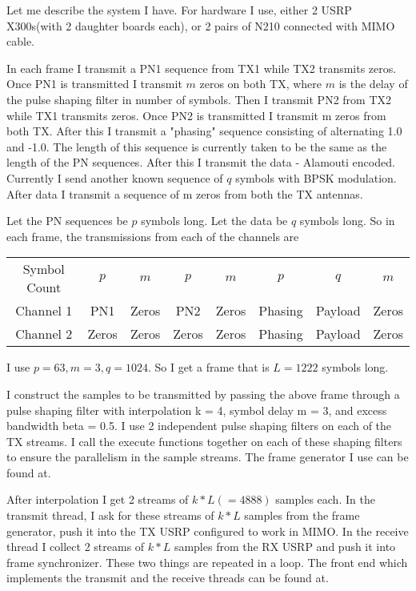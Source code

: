 \documentclass{article}
\begin{document}
Let me describe the system I have. For hardware I use, either 2 USRP
X300s(with 2 daughter boards each), or 2 pairs of N210 connected with
MIMO cable.

In each frame I transmit a PN1 sequence from TX1 while TX2 transmits
zeros. Once PN1 is transmitted I transmit $m$ zeros on both TX, where $m$ is
the delay of the pulse shaping filter in number of symbols.
Then I transmit PN2 from TX2 while TX1 transmits zeros. Once PN2 is
transmitted I transmit m zeros from both TX.
After this I transmit a "phasing" sequence consisting of alternating 1.0 
and -1.0. The length of this sequence is currently taken to be the
same as the length of the PN sequences.
After this I transmit the data - Alamouti encoded. Currently I send
another known sequence of $q$ symbols with BPSK modulation.
After data I transmit a sequence of m zeros from both the TX antennas.

Let the PN sequences be $p$ symbols long. Let the data be
$q$ symbols long. So in each frame, the transmissions from
each of the channels are

\begin{center}
\begin{tabular}{||c|c|c|c|c|c|c|c||}
  Symbol Count  &$p$    &$m$    &$p$    &$m$    &$p$      &$q$      &$m$    \\
  Channel 1     &PN1    &Zeros  &PN2    &Zeros  &Phasing  &Payload  &Zeros  \\
  Channel 2     &Zeros  &Zeros  &Zeros  &Zeros  &Phasing  &Payload  &Zeros  \\
\end{tabular}
\end{center}

\noindent
I use $p = 63, m = 3, q = 1024$. So I get a frame that is $L = 1222$
symbols long.

I construct the samples to be transmitted by passing the above frame
through a pulse shaping filter with interpolation k = 4, symbol delay m
= 3, and excess bandwidth beta = 0.5. I use 2 independent pulse shaping
filters on each of the TX streams. I call the execute functions together
on each of these shaping filters to ensure the parallelism in the sample
streams. The frame generator I use can be found at\cite{bib:framegen}.

After interpolation I get 2 streams of $k*L (=4888)$ samples each. In the
transmit thread, I ask for these streams of $k*L$ samples from the frame
generator, push it into the TX USRP configured to work in MIMO. In the
receive thread I collect 2 streams of $k*L$ samples from the RX USRP and
push it into frame synchronizer. These two things are repeated in a
loop. The front end which implements the transmit and the receive
threads can be found at\cite{bib:main}.
\end{document}
